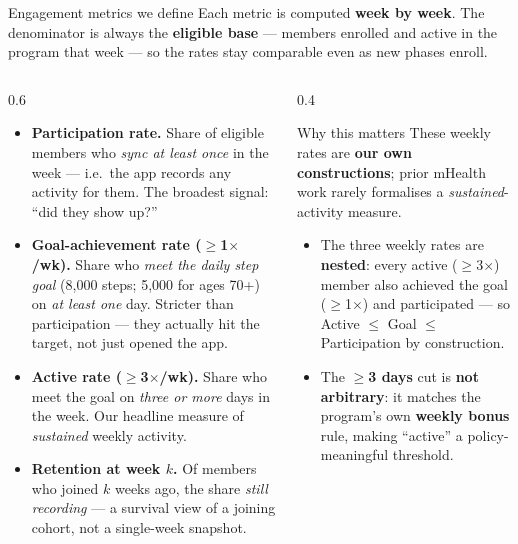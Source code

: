 \documentclass[10pt,aspectratio=169]{beamer}
\newcommand{\hc}[1]{{\color{coral}\bfseries #1}}
\begin{document}
\begin{frame}{Engagement metrics we define}
  {\footnotesize Each metric is computed \textbf{week by week}. The denominator is always the \textbf{eligible base} --- members enrolled and active in the program that week --- so the rates stay comparable even as new phases enroll.}
  \vspace*{0.5em}
  \begin{columns}[T]
    \begin{column}{0.6\textwidth}
      \begin{itemize}
        \item \textbf{\color{ink}Participation rate.} Share of eligible members who \emph{sync at least once} in the week --- i.e.\ the app records any activity for them. The broadest signal: ``did they show up?''
        \item \textbf{\color{ink}Goal-achievement rate ($\geq$1$\times$/wk).} Share who \emph{meet the daily step goal} (8{,}000 steps; 5{,}000 for ages 70+) on \emph{at least one} day. Stricter than participation --- they actually hit the target, not just opened the app.
        \item \textbf{\color{ink}Active rate ($\geq$3$\times$/wk).} Share who meet the goal on \emph{three or more} days in the week. Our headline measure of \emph{sustained} weekly activity.
        \item \textbf{\color{ink}Retention at week $k$.} Of members who joined $k$ weeks ago, the share \emph{still recording} --- a survival view of a joining cohort, not a single-week snapshot.
      \end{itemize}
    \end{column}
    \begin{column}{0.4\textwidth}
      \begin{alertblock}{Why this matters}
        These weekly rates are \hc{our own constructions}; prior mHealth work rarely formalises a \emph{sustained}-activity measure.
      \end{alertblock}
      \begin{itemize}
        \item The three weekly rates are \textbf{nested}: every active ($\geq$3$\times$) member also achieved the goal ($\geq$1$\times$) and participated --- so Active $\le$ Goal $\le$ Participation by construction.
        \item The \hc{$\geq$3 days} cut is \textbf{not arbitrary}: it matches the program's own \textbf{weekly bonus} rule, making ``active'' a policy-meaningful threshold.
      \end{itemize}
    \end{column}
  \end{columns}
\end{frame}
\end{document}
